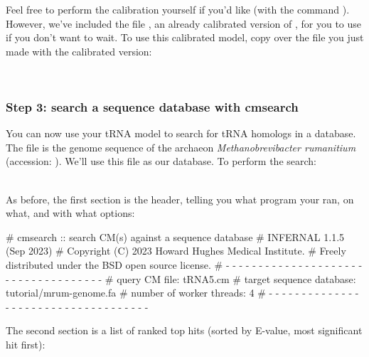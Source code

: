 Feel free to perform the calibration yourself if you'd like (with the
command ). However, we've included the file
, an already calibrated version of ,
for you to use if you don't want to wait. To use this calibrated
model, copy over the  file you just made with the
calibrated version:
 
\\
 
\subsubsection{Step 3: search a sequence database with cmsearch}

You can now use your tRNA model to search for tRNA homologs in a
database. The file  is the genome sequence of the
archaeon \emph{Methanobrevibacter rumanitium} (accession:
). We'll use this file as our database. To perform
the search:

\\

As before, the first section is the header, telling you what program
your ran, on what, and with what options:

\begin{sreoutput}
# cmsearch :: search CM(s) against a sequence database
# INFERNAL 1.1.5 (Sep 2023)
# Copyright (C) 2023 Howard Hughes Medical Institute.
# Freely distributed under the BSD open source license.
# - - - - - - - - - - - - - - - - - - - - - - - - - - - - - - - - - - - -
# query CM file:                         tRNA5.cm
# target sequence database:              tutorial/mrum-genome.fa
# number of worker threads:              4
# - - - - - - - - - - - - - - - - - - - - - - - - - - - - - - - - - - - -
\end{sreoutput}

The second section is a list of ranked top hits (sorted by E-value,
most significant hit first):


